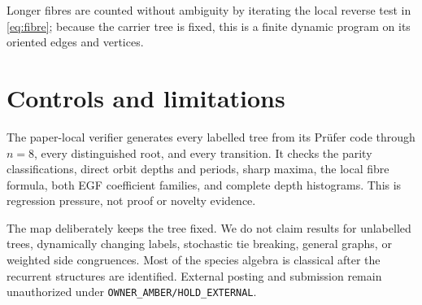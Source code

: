 \documentclass[a4paper,10pt]{amsart}
\theoremstyle{remark}
\begin{document}
Longer fibres are counted without ambiguity by iterating the local reverse
test in \eqref{eq:fibre}; because the carrier tree is fixed, this is a finite
dynamic program on its oriented edges and vertices.

\section{Controls and limitations}

The paper-local verifier generates every labelled tree from its Pr\"ufer
code through $n=8$, every distinguished root, and every transition.  It
checks the parity classifications, direct orbit depths and periods, sharp
maxima, the local fibre formula, both EGF coefficient families, and complete
depth histograms.  This is regression pressure, not proof or novelty
evidence.

The map deliberately keeps the tree fixed.  We do not claim results for
unlabelled trees, dynamically changing labels, stochastic tie breaking,
general graphs, or weighted side congruences.  Most of the species algebra is
classical after the recurrent structures are identified.  External posting
and submission remain unauthorized under
\texttt{OWNER\_AMBER/HOLD\_EXTERNAL}.



\end{document}

